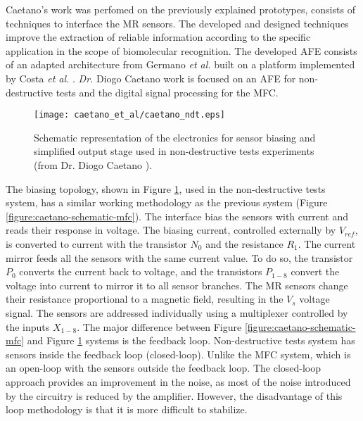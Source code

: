 Caetano's work was perfomed on the previously explained prototypes, consists of techniques to interface the \ac{MR} sensors. The developed and designed techniques improve the extraction of reliable information according to the specific application in the scope of biomolecular recognition. The developed \ac{AFE} consists of an adapted architecture from Germano \textit{et al.} \cite{Germano2006MICROSYSTEMFB} built on a platform implemented by Costa \textit{et al.} \cite{TIM.2013.2296417}. \textit{Dr.} Diogo Caetano work is focused on an \ac{AFE} for non-destructive tests and the digital signal processing for the \ac{MFC}.

\begin{figure}[!ht]
    \centering
    \texttt{[image: caetano\_et\_al/caetano\_ndt.eps]}
    \caption{Schematic representation of the electronics for sensor biasing and simplified output stage used in non-destructive tests experiments (from Dr. Diogo Caetano \cite{DiogoC_thesis}).}
    \label{figure:caetano-schematic-ndt}
\end{figure}

The biasing topology, shown in Figure \ref{figure:caetano-schematic-ndt}, used in the non-destructive tests system, has a similar working methodology as the previous system (Figure \ref{figure:caetano-schematic-mfc}). The interface bias the sensors with current and reads their response in voltage. The biasing current, controlled externally by $V_{ref}$, is converted to current with the transistor $N_0$ and the resistance $R_1$. The current mirror feeds all the sensors with the same current value. To do so, the transistor $P_0$ converts the current back to voltage, and the transistors $P_{1-8}$ convert the voltage into current to mirror it to all sensor branches. The \ac{MR} sensors change their resistance proportional to a magnetic field, resulting in the $V_s$ voltage signal. The sensors are addressed individually using a multiplexer controlled by the inputs $X_{1-8}$. The major difference between Figure \ref{figure:caetano-schematic-mfc} and Figure \ref{figure:caetano-schematic-ndt} systems is the feedback loop. Non-destructive tests system has sensors inside the feedback loop (closed-loop). Unlike the \ac{MFC} system, which is an open-loop with the sensors outside the feedback loop. The closed-loop approach provides an improvement in the noise, as most of the noise introduced by the circuitry is reduced by the amplifier. However, the disadvantage of this loop methodology is that it is more difficult to stabilize.

